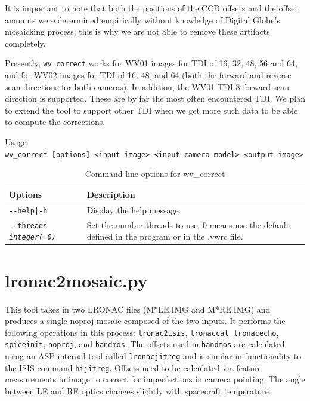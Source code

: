 It is important to note that both the positions of the CCD offsets and
the offset amounts were determined empirically without knowledge of
Digital Globe's mosaicking process; this is why we are not able to
remove these artifacts completely.

Presently, \texttt{wv\_correct} works for WV01 images for TDI of 16, 32,
48, 56 and 64, and for WV02 images for TDI of 16, 48, and 64 (both the
forward and reverse scan directions for both cameras). In addition, the WV01
TDI 8 forward scan direction is supported. These are by far the most
often encountered TDI. We plan to extend the tool to support other TDI
when we get more such data to be able to compute the corrections.

\medskip

Usage:\\
\hspace*{2em}\texttt{wv\_correct [options] <input image> <input camera model> <output image>}

\medskip

\begin{longtable}{|p{8cm}|p{9cm}|}
\caption{Command-line options for wv\_correct}
\label{tbl:wvcorrect}
\endfirsthead
\endhead
\endfoot
\endlastfoot
\hline
Options & Description \\ \hline \hline
\texttt{-\/-help|-h} & Display the help message.\\ \hline
\texttt{-\/-threads \textit{integer(=0)}} & Set the number threads to
use. 0 means use the default defined in the program or in the .vwrc file. \\ \hline
\end{longtable}

\section{lronac2mosaic.py}
\label{lronac2mosaic}

This tool takes in two LRONAC files (M*LE.IMG and M*RE.IMG) and
produces a single noproj mosaic composed of the two inputs.  It
performs the following operations in this process:
\texttt{lronac2isis}, \texttt{lronaccal}, \texttt{lronacecho},
\texttt{spiceinit}, \texttt{noproj}, and \texttt{handmos}. The offsets
used in \texttt{handmos} are calculated using an ASP internal tool
called \texttt{lronacjitreg} and is similar in functionality to the
ISIS command \texttt{hijitreg}. Offsets need to be calculated via
feature measurements in image to correct for imperfections in camera
pointing. The angle between LE and RE optics changes slightly with
spacecraft temperature.

